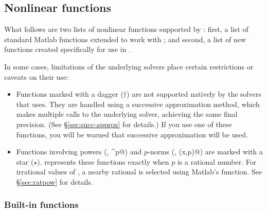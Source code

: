 \documentclass[12pt]{article}
\begin{document}
\subsection{Nonlinear functions}
\label{sec:nonl}

What follows are two lists of nonlinear functions supported by \cvx: first, a
list of standard Matlab functions extended to work with \cvx; and second, a list
of new functions created specifically for use in \cvx.

In some cases, limitations of the underlying solvers place certain restrictions
or caveats on their use:
\begin{itemize}
\item Functions marked with a dagger ($\dagger$) are not supported natively by
      the solvers that \cvx uses.  They are handled using
a successive approximation method, which makes multiple calls to the 
underlying solver, achieving the same final precision.
(See \S\ref{sec:succ-approx} for details.)
If you use one of these functions, you will be warned that successive 
approximation will be used.

\item Functions involving powers (\eg, \verb@x^p@) and $p$-norms (\eg, \verb@norm(x,p)@)
      are marked with a star ($\star$). \cvx represents these functions exactly
      when $p$ is a rational number. For irrational values of \verb@p@, a nearby
      rational is selected using Matlab's \verb@rat@ function. See 
      \S\ref{sec:ratpow} for details.
\end{itemize}      

\subsubsection{Built-in functions}
\end{document}
